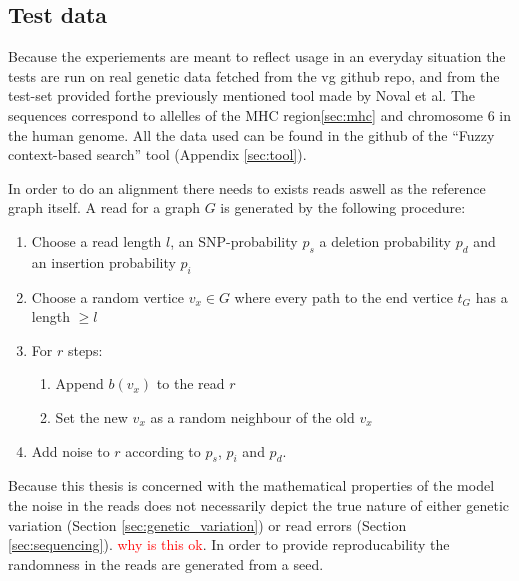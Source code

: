 \documentclass[thesis.tex]{subfiles}
\begin{document}
\subsection{Test data}
Because the experiements are meant to reflect usage in an everyday situation the tests are run on real genetic data fetched from the vg github repo\cite{vg}, and from the test-set provided forthe previously mentioned tool made by Noval et al. The sequences correspond to allelles of the MHC region\ref{sec:mhc} and chromosome 6 in the human genome. All the data used can be found in the github of the ``Fuzzy context-based search'' tool (Appendix \ref{sec:tool}).\\
\par\noindent
In order to do an alignment there needs to exists reads aswell as the reference graph itself. A read for a graph $G$ is generated by the following procedure:
\begin{enumerate}
  \item Choose a read length $l$, an SNP-probability $p_s$ a deletion probability $p_d$ and an insertion probability $p_i$
  \item Choose a random vertice $v_x \in G$ where every path to the end vertice $t_G$ has a length $\geq l$
  \item For $r$ steps:
  \begin{enumerate}
    \item Append $b(v_x)$ to the read $r$
    \item Set the new $v_x$ as a random neighbour of the old $v_x$
  \end{enumerate}
  \item Add noise to $r$ according to $p_s$, $p_i$ and $p_d$.
\end{enumerate}
Because this thesis is concerned with the mathematical properties of the model the noise in the reads does not necessarily depict the true nature of either genetic variation (Section \ref{sec:genetic_variation}) or read errors (Section \ref{sec:sequencing}). \textcolor{red}{why is this ok}. In order to provide reproducability the randomness in the reads are generated from a seed.
\end{document}
